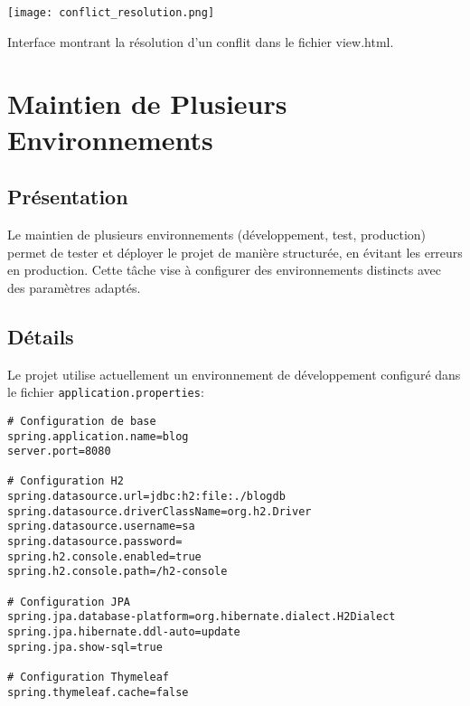 \begin{center}
\begin{minipage}{\textwidth}
  \begin{tcolorbox}[enhanced, colback=lightgray, colframe=accentblue, arc=5pt, boxrule=0.5pt, drop shadow]
    \centering
    \texttt{[image: conflict\_resolution.png]}
    \label{fig:conflict-resolution}
    \vspace{0.5cm}
    \parbox{0.9\textwidth}{\centering Interface montrant la résolution d'un conflit dans le fichier view.html.}
  \end{tcolorbox}
\end{minipage}
\end{center}

\section{Maintien de Plusieurs Environnements}
\subsection{Présentation}
Le maintien de plusieurs environnements (développement, test, production) permet de tester et déployer le projet de manière structurée, en évitant les erreurs en production. Cette tâche vise à configurer des environnements distincts avec des paramètres adaptés.

\subsection{Détails}
Le projet utilise actuellement un environnement de développement configuré dans le fichier \texttt{application.properties}:

\begin{verbatim}
# Configuration de base
spring.application.name=blog
server.port=8080

# Configuration H2
spring.datasource.url=jdbc:h2:file:./blogdb
spring.datasource.driverClassName=org.h2.Driver
spring.datasource.username=sa
spring.datasource.password=
spring.h2.console.enabled=true
spring.h2.console.path=/h2-console

# Configuration JPA
spring.jpa.database-platform=org.hibernate.dialect.H2Dialect
spring.jpa.hibernate.ddl-auto=update
spring.jpa.show-sql=true

# Configuration Thymeleaf
spring.thymeleaf.cache=false
\end{verbatim}

